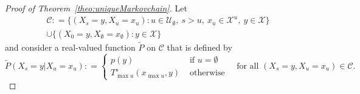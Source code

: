 \documentclass[10pt]{paper}
\theoremstyle{definition}
\newcommand{\states}{\mathcal{X}}
\newcommand{\coloneqq}{:\!=}
\begin{document}
\begin{proof}[Proof of Theorem~\ref{theo:uniqueMarkovchain}]
Let
\begin{multline*}
\mathcal{C}\coloneqq\{
(X_s=y,X_u=x_u)
\colon 
u\in\mathcal{U}_\emptyset,~s>u,~x_u\in\states^u,~y\in\states
\}\\
\cup
\{
(X_0=y,X_\emptyset=x_\emptyset)\colon y\in\states
\}
\end{multline*}
and consider a real-valued function $\tilde{P}$ on $\mathcal{C}$ that is defined by 
\begin{equation*}
\tilde{P}(X_s=y\vert X_u=x_u)
\coloneqq
\begin{cases}
p(y)&\text{~if $u=\emptyset$}\\
T_{\max u}^s(x_{\max u},y)&\text{~otherwise}
\end{cases}
\text{~~~for all $(X_s=y,X_u=x_u)\in\mathcal{C}$.}
\end{equation*}



\end{proof}
\end{document}
